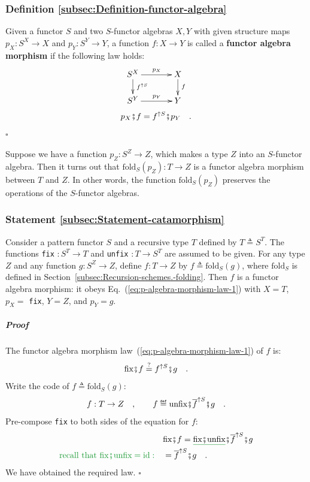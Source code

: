 \subsubsection{Definition \label{subsec:Definition-functor-algebra}\ref{subsec:Definition-functor-algebra}}

Given a functor $S$ and two $S$-functor algebras $X,$$Y$ with
given structure maps $p_{X}:S^{X}\rightarrow X$ and $p_{Y}:S^{Y}\rightarrow Y$,
a function $f:X\rightarrow Y$ is called a \textbf{functor algebra
morphism} if the following law holds:
\[
\xymatrix{\xyScaleY{1.4pc}\xyScaleX{3.0pc}S^{X}\ar[r]\sp(0.5){\ p_{X}}\ar[d]\sp(0.45){\,f^{\uparrow S}} & X\ar[d]\sp(0.45){\,f}\\
S^{Y}\ar[r]\sp(0.5){~p_{Y}} & Y
}
\]
\begin{equation}
p_{X}\bef f=f^{\uparrow S}\bef p_{Y}\quad.\label{eq:p-algebra-morphism-law-1}
\end{equation}
$\square$

Suppose we have a function $p_{Z}:S^{Z}\rightarrow Z$, which makes
a type $Z$ into an $S$-functor algebra. Then it turns out that $\text{fold}_{S}(p_{Z}):T\rightarrow Z$
is a functor algebra morphism between $T$ and $Z$. In other words,
the function $\text{fold}_{S}(p_{Z})$ preserves the operations of
the $S$-functor algebras.

\subsubsection{Statement \label{subsec:Statement-catamorphism}\ref{subsec:Statement-catamorphism}}

Consider a pattern functor $S$ and a recursive type $T$ defined
by $T\triangleq S^{T}$. The functions \lstinline!fix! $:S^{T}\rightarrow T$
and \lstinline!unfix! $:T\rightarrow S^{T}$ are assumed to be given.
For any type $Z$ and any function $g:S^{Z}\rightarrow Z$, define
$f:T\rightarrow Z$ by $f\triangleq\text{fold}_{S}(g)$, where $\text{fold}_{S}$
is defined in Section~\ref{subsec:Recursion-schemes.-folding}. Then
$f$ is a functor algebra morphism: it obeys Eq.~(\ref{eq:p-algebra-morphism-law-1})
with $X=T$, $p_{X}=$ \lstinline!fix!, $Y=Z$, and $p_{Y}=g$. 

\subparagraph{Proof}

The functor algebra morphism law~(\ref{eq:p-algebra-morphism-law-1})
of $f$ is:
\[
\text{fix}\bef f\overset{?}{=}f^{\uparrow S}\bef g\quad.
\]
Write the code of $f\triangleq\text{fold}_{S}(g)$:
\[
f:T\rightarrow Z\quad,\quad\quad f\triangleq\text{unfix}\bef\overline{f}^{\uparrow S}\bef g\quad.
\]
Pre-compose \lstinline!fix! to both sides of the equation for $f$:
\begin{align*}
 & \text{fix}\bef f=\gunderline{\text{fix}\bef\text{unfix}}\bef\overline{f}^{\uparrow S}\bef g\\
{\color{greenunder}\text{recall that }\text{fix}\bef\text{unfix}=\text{id}:}\quad & =\overline{f}^{\uparrow S}\bef g\quad.
\end{align*}
We have obtained the required law. $\square$

